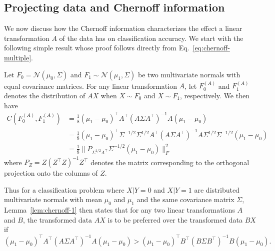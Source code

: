 \documentclass[10pt]{article}
\begin{document}
\subsection{Projecting data and Chernoff information}
We now discuss how the Chernoff information characterizes the effect a linear transformation $A$ of the data has on classification accuracy.
We start with the following simple result whose proof follows directly from Eq.~\eqref{eq:chernoff-multiple}.
\begin{lem}
\label{lem:chernoff-1}
Let $F_0 = \mathcal{N}(\mu_0, \Sigma)$ and $F_1 \sim \mathcal{N}(\mu_1, \Sigma)$ be two multivariate normals with equal covariance matrices. For any linear transformation $A$, let $F_0^{(A)}$ and $F_1^{(A)}$ denotes the distribution of $AX$ when $X \sim F_0$ and $X \sim F_1$, respectively. We then have
\begin{equation}
\begin{split}
C(F_0^{(A)}, F_1^{(A)}) &= \frac{1}{8} (\mu_1 - \mu_0)^{\top} A^{\top} (A \Sigma A^{\top})^{-1} A (\mu_1 - \mu_0) \\ & = \frac{1}{8} (\mu_1 - \mu_0)^{\top} \Sigma^{-1/2} \Sigma^{1/2} A^{\top} (A \Sigma A^{\top})^{-1} A \Sigma^{1/2} \Sigma^{-1/2} (\mu_1 - \mu_0) \\
&= \frac{1}{8} \|P_{\Sigma^{1/2} A^{\top}} \Sigma^{-1/2} (\mu_1 - \mu_0) \|_{F}^{2}
\end{split}
\end{equation}
where $P_{Z} = Z(Z^{\top} Z)^{-1} Z^{\top}$ denotes the matrix corresponding to the orthogonal projection onto the columns of $Z$.
\end{lem}

Thus for a classification problem where $X | Y = 0$ and $X | Y = 1$ are distributed multivariate normals with mean $\mu_0$ and $\mu_1$ and the same covariance matrix $\Sigma$, Lemma~\ref{lem:chernoff-1} then states that for any two linear transformations $A$ and $B$, the transformed data $AX$ is to be preferred over the transformed data $BX$ if
$$ (\mu_1 - \mu_0)^{\top} A^{\top} (A \Sigma A^{\top})^{-1} A (\mu_1 - \mu_0) > (\mu_1 - \mu_0)^{\top} B^{\top} (B \Sigma B^{\top})^{-1} B (\mu_1 - \mu_0). $$
\end{document}
